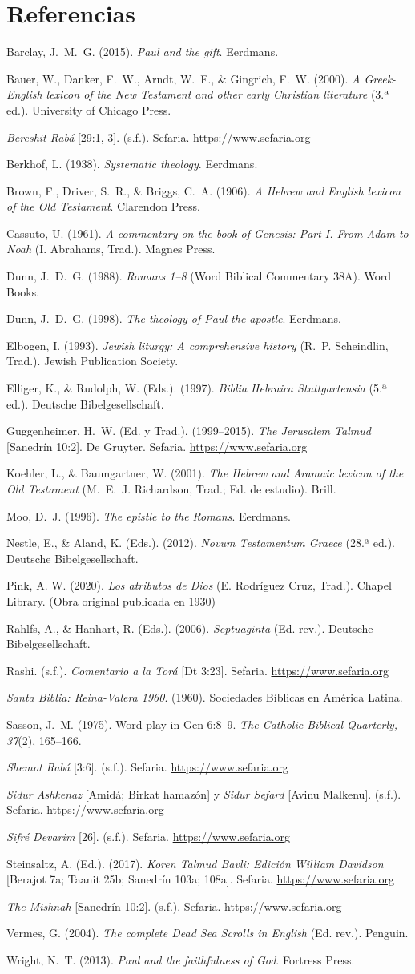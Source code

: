 \documentclass[11pt,letterpaper]{article}
\newcommand{\refapa}[1]{\par{\RaggedRight\hangindent=1.27cm\hangafter=1\noindent #1\par}\vspace{4pt}}
\begin{document}
\section*{Referencias}
\refapa{Barclay, J.~M.~G. (2015). \emph{Paul and the gift}. Eerdmans.}
\refapa{Bauer, W., Danker, F.~W., Arndt, W.~F., \& Gingrich, F.~W. (2000). \emph{A Greek-English lexicon of the New Testament and other early Christian literature} (3.ª ed.). University of Chicago Press.}
\refapa{\emph{Bereshit Rabá} [29:1, 3]. (s.f.). Sefaria. \url{https://www.sefaria.org}}
\refapa{Berkhof, L. (1938). \emph{Systematic theology}. Eerdmans.}
\refapa{Brown, F., Driver, S.~R., \& Briggs, C.~A. (1906). \emph{A Hebrew and English lexicon of the Old Testament}. Clarendon Press.}
\refapa{Cassuto, U. (1961). \emph{A commentary on the book of Genesis: Part I. From Adam to Noah} (I. Abrahams, Trad.). Magnes Press.}
\refapa{Dunn, J.~D.~G. (1988). \emph{Romans 1--8} (Word Biblical Commentary 38A). Word Books.}
\refapa{Dunn, J.~D.~G. (1998). \emph{The theology of Paul the apostle}. Eerdmans.}
\refapa{Elbogen, I. (1993). \emph{Jewish liturgy: A comprehensive history} (R.~P. Scheindlin, Trad.). Jewish Publication Society.}
\refapa{Elliger, K., \& Rudolph, W. (Eds.). (1997). \emph{Biblia Hebraica Stuttgartensia} (5.ª ed.). Deutsche Bibelgesellschaft.}
\refapa{Guggenheimer, H.~W. (Ed. y Trad.). (1999--2015). \emph{The Jerusalem Talmud} [Sanedrín 10:2]. De Gruyter. Sefaria. \url{https://www.sefaria.org}}
\refapa{Koehler, L., \& Baumgartner, W. (2001). \emph{The Hebrew and Aramaic lexicon of the Old Testament} (M.~E.~J. Richardson, Trad.; Ed. de estudio). Brill.}
\refapa{Moo, D.~J. (1996). \emph{The epistle to the Romans}. Eerdmans.}
\refapa{Nestle, E., \& Aland, K. (Eds.). (2012). \emph{Novum Testamentum Graece} (28.ª ed.). Deutsche Bibelgesellschaft.}
\refapa{Pink, A. W. (2020). \emph{Los atributos de Dios} (E. Rodríguez Cruz, Trad.). Chapel Library. (Obra original publicada en 1930)}
\refapa{Rahlfs, A., \& Hanhart, R. (Eds.). (2006). \emph{Septuaginta} (Ed. rev.). Deutsche Bibelgesellschaft.}
\refapa{Rashi. (s.f.). \emph{Comentario a la Torá} [Dt 3:23]. Sefaria. \url{https://www.sefaria.org}}
\refapa{\emph{Santa Biblia: Reina-Valera 1960}. (1960). Sociedades Bíblicas en América Latina.}
\refapa{Sasson, J.~M. (1975). Word-play in Gen 6:8--9. \emph{The Catholic Biblical Quarterly, 37}(2), 165--166.}
\refapa{\emph{Shemot Rabá} [3:6]. (s.f.). Sefaria. \url{https://www.sefaria.org}}
\refapa{\emph{Sidur Ashkenaz} [Amidá; Birkat hamazón] y \emph{Sidur Sefard} [Avinu Malkenu]. (s.f.). Sefaria. \url{https://www.sefaria.org}}
\refapa{\emph{Sifré Devarim} [26]. (s.f.). Sefaria. \url{https://www.sefaria.org}}
\refapa{Steinsaltz, A. (Ed.). (2017). \emph{Koren Talmud Bavli: Edición William Davidson} [Berajot 7a; Taanit 25b; Sanedrín 103a; 108a]. Sefaria. \url{https://www.sefaria.org}}
\refapa{\emph{The Mishnah} [Sanedrín 10:2]. (s.f.). Sefaria. \url{https://www.sefaria.org}}
\refapa{Vermes, G. (2004). \emph{The complete Dead Sea Scrolls in English} (Ed. rev.). Penguin.}
\refapa{Wright, N.~T. (2013). \emph{Paul and the faithfulness of God}. Fortress Press.}
\end{document}
